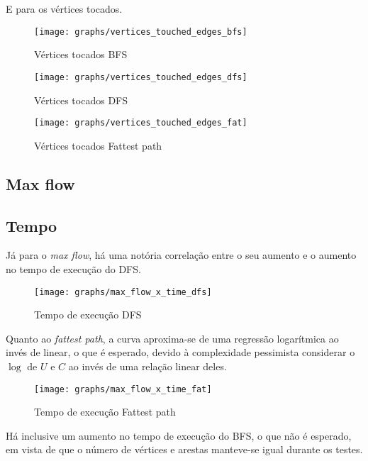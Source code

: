 \documentclass[11pt]{article}
\begin{document}
E para os vértices tocados.

\begin{figure}[H]
	\centering
	\caption{Vértices tocados BFS}
	\label{fig:vertices_touched_edges_bfs}
	\texttt{[image: graphs/vertices\_touched\_edges\_bfs]}
\end{figure}

\begin{figure}[h]
	\centering
	\caption{Vértices tocados DFS}
	\label{fig:vertices_touched_edges_dfs}
	\texttt{[image: graphs/vertices\_touched\_edges\_dfs]}
\end{figure}

\begin{figure}[H]
	\centering
	\caption{Vértices tocados Fattest path}
	\label{fig:vertices_touched_edges_fat}
	\texttt{[image: graphs/vertices\_touched\_edges\_fat]}
\end{figure}

\subsection{Max flow}

\subsection{Tempo}

Já para o \textit{max flow}, há uma notória correlação entre o seu aumento e o aumento no tempo de execução do DFS.

\begin{figure}[H]
	\centering
	\caption{Tempo de execução DFS}
	\label{fig:max_flow_x_time_dfs}
	\texttt{[image: graphs/max\_flow\_x\_time\_dfs]}
\end{figure}

Quanto ao \textit{fattest path}, a curva aproxima-se de uma regressão logarítmica ao invés de linear, o que é esperado, devido à complexidade pessimista considerar o $\log$ de $U$ e $C$ ao invés de uma relação linear deles.

\begin{figure}[H]
	\centering
	\caption{Tempo de execução Fattest path}
	\label{fig:max_flow_x_time_fat}
	\texttt{[image: graphs/max\_flow\_x\_time\_fat]}
\end{figure}

Há inclusive um aumento no tempo de execução do BFS, o que não é esperado, em vista de que o número de vértices e arestas manteve-se igual durante os testes.
\end{document}
